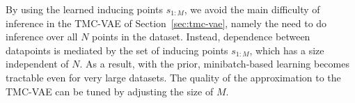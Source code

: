 %
%
%
By using the learned inducing points $s_{1:M}$, we avoid the main difficulty of inference in the TMC-VAE of Section~\ref{sec:tmc-vae}, namely the need to do inference over all $N$ points in the dataset.
Instead, dependence between datapoints is mediated by the set of inducing points $s_{1:M}$, which has a size independent of $N$.
As a result, with the \acronym\;prior, minibatch-based learning becomes tractable even for very large datasets.
The quality of the approximation to the TMC-VAE can be tuned by adjusting the size of $M$.

